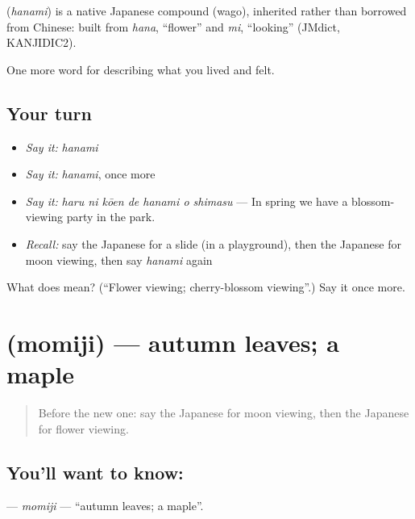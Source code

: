 \begin{cousinweb}
\textbf{} (\emph{hanami}) is a native Japanese compound (wago), inherited rather than borrowed from Chinese: built from \emph{hana}, \textquotedblleft{}flower\textquotedblright{} and \emph{mi}, \textquotedblleft{}looking\textquotedblright{} (JMdict, KANJIDIC2).
\end{cousinweb}

\begin{grammarlens}[title={What you've built}]
One more word for describing what you lived and felt.
\end{grammarlens}

\subsection*{Your turn}
\begin{itemize}
\raggedright
  \item \emph{Say it:} \emph{hanami}
  \item \emph{Say it:} \emph{hanami}, once more
  \item \emph{Say it:} \emph{haru ni kōen de hanami o shimasu} — In spring we have a blossom-viewing party in the park.
  \item \emph{Recall:} say the Japanese for a slide (in a playground), then the Japanese for moon viewing, then say \emph{hanami} again
\end{itemize}

\begin{tcolorbox}[breakable,colback=teal!4,colframe=teal!35!black,title={Before you move on}]
What does  mean? (\textquotedblleft{}Flower viewing; cherry-blossom viewing\textquotedblright{}.) Say it once more.
\end{tcolorbox}
\section[\texorpdfstring{\ja{もみじ} (momiji)}{もみじ (momiji)}]{ (momiji) — autumn leaves; a maple}

\label{lesson:JA-C501-momiji}



\begin{quote}
Before the new one: say the Japanese for moon viewing, then the Japanese for flower viewing.
\end{quote}

\subsection*{You'll want to know: }
\textbf{} — \emph{momiji} — \textquotedblleft{}autumn leaves; a maple\textquotedblright{}.

